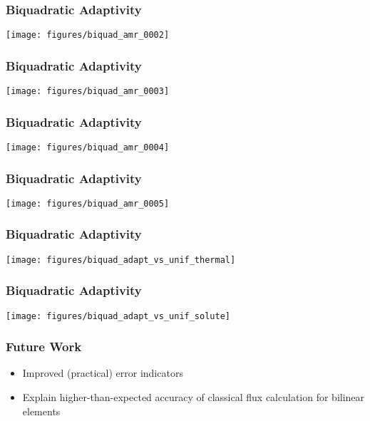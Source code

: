   \begin{frame}
  \frametitle{Biquadratic Adaptivity}
  \begin{center}
	\texttt{[image: figures/biquad\_amr\_0002]}    
  \end{center}
\end{frame}
\begin{frame}
  \frametitle{Biquadratic Adaptivity}
  \begin{center}
	\texttt{[image: figures/biquad\_amr\_0003]}    
  \end{center}
\end{frame}
\begin{frame}
  \frametitle{Biquadratic Adaptivity}
  \begin{center}
	\texttt{[image: figures/biquad\_amr\_0004]}    
  \end{center}
\end{frame}
\begin{frame}
  \frametitle{Biquadratic Adaptivity}
  \begin{center}
	\texttt{[image: figures/biquad\_amr\_0005]}    
  \end{center}
\end{frame}
\begin{frame}
  \frametitle{Biquadratic Adaptivity}
  \begin{center}
	\texttt{[image: figures/biquad\_adapt\_vs\_unif\_thermal]}    
  \end{center}
\end{frame}
\begin{frame}
  \frametitle{Biquadratic Adaptivity}
  \begin{center}
	\texttt{[image: figures/biquad\_adapt\_vs\_unif\_solute]}    
  \end{center}
\end{frame}






\begin{frame}
  \frametitle{Future Work}
  \begin{itemize}
    \item{Improved (practical) error indicators}
    \item{Explain higher-than-expected accuracy of classical
      flux calculation for bilinear elements} 
  \end{itemize}
\end{frame}
